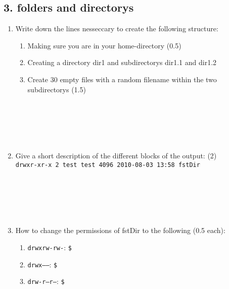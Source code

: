 \documentclass[11pt]{article}
\begin{document}
\subsection*{3. folders and directorys}
\begin{enumerate}
    \item Write down the lines nesseccary to create the following structure:
    \begin{enumerate}
        \item Making sure you are in your home-directory (0.5)
        \item Creating a directory dir1 and subdirectorys dir1.1 and dir1.2 
        \item Create 30 empty files with a random filename within the two subdirectorys (1.5) \\
        \\
        \\
        \\
        \\
        \\
    \end{enumerate} 
    \item Give a short description of the different blocks of the output: (2) \\
    \texttt{drwxr-xr-x 2 test test 4096 2010-08-03 13:58 fstDir} \\
    \\
    \\
    \\
    \\
    \\
    \item How to change the permissions of fstDir to the following (0.5 each):
    \begin{enumerate}
        \item \texttt{drwxrw-rw-}: \texttt{\$}
        \item \texttt{drwx------}: \texttt{\$}
        \item \texttt{drw-r--r--}: \texttt{\$}
    \end{enumerate}
\newpage

\end{enumerate}
\end{document}
